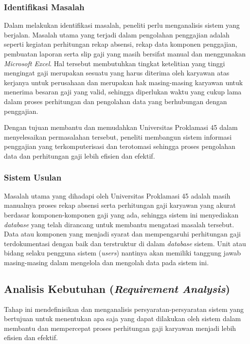 			\subsubsection{Identifikasi Masalah}
			    Dalam melakukan identifikasi masalah, peneliti perlu menganalisis sistem yang berjalan. Masalah utama yang terjadi dalam pengolahan penggajian adalah seperti kegiatan perhitungan rekap absensi, rekap data komponen penggajian, pembuatan laporan serta slip gaji yang masih bersifat manual dan menggunakan \emph{Microsoft Excel}. Hal tersebut membutuhkan tingkat ketelitian yang tinggi mengingat gaji merupakan sesuatu yang harus diterima oleh karyawan atas kerjanya untuk perusahaan dan merupakan hak masing-masing karyawan untuk menerima besaran gaji yang valid, sehingga diperlukan waktu yang cukup lama dalam proses perhitungan dan pengolahan data yang berhubungan dengan penggajian.
			    
			    Dengan tujuan membantu dan memudahkan Universitas Proklamasi 45 dalam menyelesaikan permasalahan tersebut, peneliti membangun sistem informasi penggajian yang terkomputerisasi dan terotomasi sehingga proses pengolahan data dan perhitungan gaji lebih efisien dan efektif.

			\subsubsection{Sistem Usulan}
			    Masalah utama yang dihadapi oleh Universitas Proklamasi 45 adalah masih manualnya proses rekap absensi serta perhitungan gaji karyawan yang akurat berdasar komponen-komponen gaji yang ada, sehingga sistem ini menyediakan \emph{database} yang telah dirancang untuk membantu mengatasi masalah tersebut. Data atau komponen yang menjadi syarat dan mempengaruhi perhitungan gaji terdokumentasi dengan baik dan terstruktur di dalam \emph{database} sistem. Unit atau bidang selaku pengguna sistem (\emph{users}) nantinya akan memiliki tanggung jawab masing-masing dalam mengelola dan mengolah data pada sistem ini.

		\subsection{Analisis Kebutuhan (\emph{Requirement Analysis})}
			Tahap ini mendefinisikan dan menganalisis persyaratan-persyaratan sistem yang bertujuan untuk menentukan apa saja yang dapat dilakukan oleh sistem dalam membantu dan mempercepat proses perhitungan gaji karyawan menjadi lebih efisien dan efektif.
			
